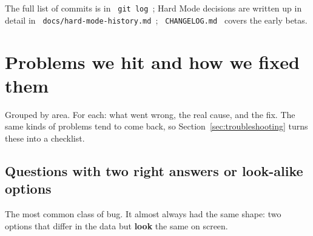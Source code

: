 \documentclass[12pt,a4paper]{article}
\newcommand{\thead}[1]{\bfseries #1}
\newcommand{\codebs}{\symbol{92}\penalty50\relax}
\newcommand{\code}[1]{\texttt{\let\textbackslash\codebs\XeTeXinterchartokenstate=1 #1\XeTeXinterchartokenstate=0 }}
\begin{document}
The full list of commits is in \code{git log}; Hard Mode decisions are written up in detail in \code{docs/hard-mode-history.md}; \code{CHANGELOG.md} covers the early betas.

\section{Problems we hit and how we fixed them}\label{sec:problems}

Grouped by area. For each: what went wrong, the real cause, and the fix. The same kinds of problems tend to come back, so Section~\ref{sec:troubleshooting} turns these into a checklist.

\newcommand{\probhead}{\thead{Problem} & \thead{Cause} & \thead{Fix} \\ \midrule}

\subsection{Questions with two right answers or look-alike options}

The most common class of bug. It almost always had the same shape: two options that differ in the data but \textbf{look} the same on screen.
\end{document}

